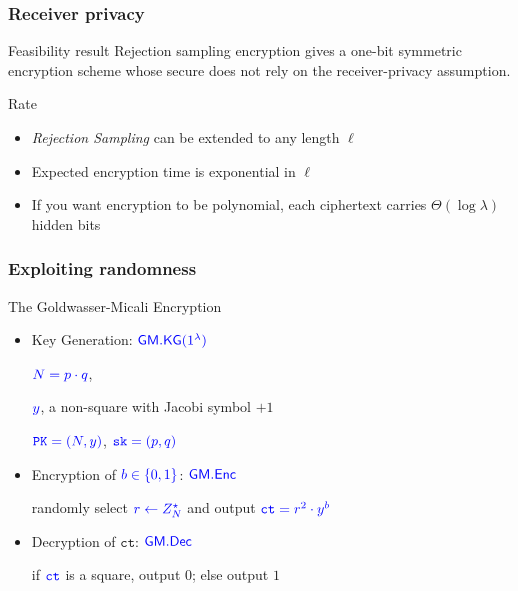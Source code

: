 \documentclass[]{beamer}
\newcommand{\secprm}{\lambda}
\newcommand{\zu}{\{0,1\}}
\newcommand{\from}{\leftarrow}
\newcommand{\algofont}[1]{{\mathsf{#1}}}
\newcommand{\objfont}[1]{{\mathtt{#1}}}
\newcommand{\kg}{\algofont{KG}}
\newcommand{\enc}{\algofont{Enc}}
\newcommand{\dec}{\algofont{Dec}}
\newcommand{\GM}{\algofont{GM}}
\newcommand{\ct}{\objfont{ct}}      %
\newcommand{\pk}{\objfont{PK}}      %
\newcommand{\sk}{\objfont{sk}}      %
\begin{document}
\begin{frame}
\frametitle{Receiver privacy}

\begin{block}{Feasibility result}
{\color{brown} 
Rejection sampling encryption gives a one-bit symmetric
encryption scheme whose secure does not rely on the receiver-privacy
assumption.
}

\end{block}

\vfill
\begin{block}{Rate}

\begin{itemize}
\item {\em \color{brown} Rejection Sampling} can be extended to any length $\ell$ 
\item Expected encryption time is exponential in $\ell$
\item If you want encryption to be polynomial,
each ciphertext carries $\Theta(\log\secprm)$ hidden bits
\end{itemize}
\end{block}
\end{frame}

\begin{frame}
\frametitle{Exploiting randomness}
\begin{block}{The Goldwasser-Micali Encryption}
\begin{itemize}
    \item {\color{purple} Key Generation: } $\color{blue}\GM.\kg(1^\secprm)$

        $\color{blue} N=p\cdot q$, 

        $\color{blue} y$, a non-square with Jacobi symbol $+1$

        $\color{blue} \pk=(N,y)$, $\color{blue} \sk=(p,q)$

    \item {\color{purple} Encryption of $\color{blue} b\in\zu$:} $\color{blue}\GM.\enc$

        randomly select $\color{blue} r\from Z_N^\star$ and output
            $\color{blue} \ct=r^2\cdot y^b$

    \item {\color{purple} Decryption of $\ct$:} $\color{blue}\GM.\dec$

            if $\color{blue} \ct$ is a square, output $0$; else output $1$
        
\end{itemize}
\end{block}
\end{frame}
\end{document}
